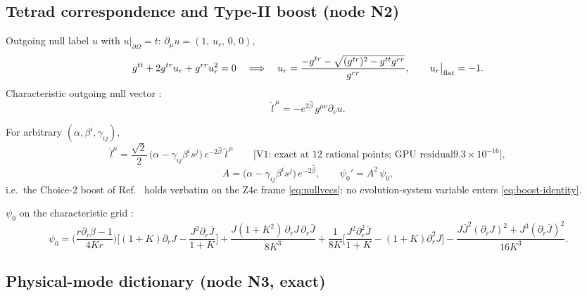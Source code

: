 \subsection{Tetrad correspondence and Type-II boost (node N2)}
\label{sec:n2}

Outgoing null label $u$ with $u|_{\partial\Omega}=t$:
$\partial_\mu u = (1,\,u_r,\,0,\,0)$,
\begin{equation}
g^{tt} + 2g^{tr}u_r + g^{rr}u_r^2 = 0
\quad\Longrightarrow\quad
u_r = \frac{-g^{tr}-\sqrt{(g^{tr})^2 - g^{tt}g^{rr}}}{g^{rr}},
\qquad u_r\big|_{\rm flat} = -1 .
\label{eq:uroot}
\end{equation}
Characteristic outgoing null vector \cite{Moxon:2020gha,Ma:2023qjn}:
\begin{equation}
\hat l^{\,\mu} = -e^{2\hat\beta}\,g^{\mu\nu}\partial_\nu u .
\label{eq:lhat}
\end{equation}
\begin{nfblock}
For arbitrary $(\alpha,\beta^i,\gamma_{ij})$,
\begin{equation}
\mathring{l}^{\mu}
 = \frac{\sqrt{2}}{2}\,
 \big(\alpha-\gamma_{ij}\beta^i s^j\big)\,e^{-2\hat\beta}\;
 \hat l^{\,\mu}
\qquad\text{[V1: exact at 12 rational points; GPU residual
$9.3\times10^{-16}$]},
\label{eq:boost-identity}
\end{equation}
\begin{equation}
A = \big(\alpha-\gamma_{ij}\beta^i s^j\big)\,e^{-2\hat\beta},
\qquad
\psi_0' = A^2\,\psi_0 ,
\label{eq:boost}
\end{equation}
i.e.\ the Choice-2 boost of Ref.~\cite{Ma:2023qjn} holds verbatim on the Z4c
frame \eqref{eq:nullvecs}: no evolution-system variable enters
\eqref{eq:boost-identity}.
\end{nfblock}
$\psi_0$ on the characteristic grid \cite{Moxon:2020gha,Ma:2023qjn}:
\begin{equation}
\psi_0=\Big(\frac{r\partial_{r}\beta-1}{4Kr}\Big)
\Big[(1{+}K)\partial_{r}J-\frac{J^2\partial_{r}\bar{J}}{1{+}K}\Big]
+\frac{J(1{+}K^2)\,\partial_{r}J\,\partial_{r}\bar{J}}{8K^3}
+\frac{1}{8K}\Big[\frac{J^2\partial^2_{r}\bar{J}}{1{+}K}
 -(1{+}K)\partial_{r}^2J\Big]
-\frac{J\bar{J}^2(\partial_{r}J)^2+J^3(\partial_{r}\bar{J})^2}{16K^3}.
\label{eq:psi0cce}
\end{equation}

\subsection{Physical-mode dictionary (node N3, exact)}
\label{sec:n3}

